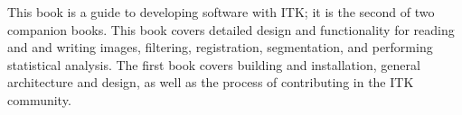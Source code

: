 This book is a guide to developing software with ITK; it is the second of two
companion books. This book covers detailed design and functionality for
reading and and writing images, filtering, registration, segmentation, and
performing statistical analysis. The first book covers building and installation, general
architecture and design, as well as the process of contributing in the ITK
community.
